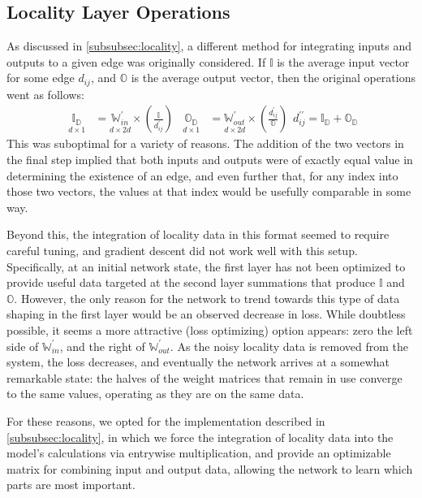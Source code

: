 \subsection{Locality Layer Operations}
\label{subsec:localops}
As discussed in \ref{subsubsec:locality}, a different method for integrating 
inputs and outputs to a given edge was originally considered. If $\mathbb{I}$ is 
the average input vector for some edge $d_{ij}$, and $\mathbb{O}$ is the average 
output vector, then the original operations went as follows:
\begin{subequations}
\begin{align}
	\underset{d \times 1}{\mathbb{I_D}} &= \underset{d \times 
	2d}{\mathbb{W}_{in}^\prime} \times 
	\left(\frac{\mathbb{I}}{d_{ij}^\prime}\right) &
	\underset{d \times 1}{\mathbb{O_D}} &= \underset{d \times 
		2d}{\mathbb{W}_{out}^\prime} \times 
		\left(\frac{d_{ij}^\prime}{\mathbb{O}}\right)
\end{align}
\begin{equation}
		d_{ij}^{\prime\prime} = \mathbb{I_D} + \mathbb{O_D}
\end{equation}
\end{subequations}
This was suboptimal for a variety of reasons. The addition of the two vectors in 
the final step implied that both inputs and outputs were of exactly equal value 
in determining the existence of an edge, and even further that, for any index 
into those two vectors, the values at that index would be usefully comparable in 
some way.

Beyond this, the integration of locality data in this format seemed to require 
careful tuning, and gradient descent did not work well with this setup.  
Specifically, at an initial network state, the first layer has not been 
optimized to provide useful data targeted at the second layer summations that 
produce $\mathbb{I}$ and $\mathbb{O}$. However, the only reason for the network 
to trend towards this type of data shaping in the first layer would be an 
observed decrease in loss. While doubtless possible, it seems a more attractive 
(loss optimizing) option appears: zero the left side of 
$\mathbb{W}_{in}^\prime$, and the right of $\mathbb{W}_{out}^\prime$. As the 
noisy locality data is removed from the system, the loss decreases, and 
eventually the network arrives at a somewhat remarkable state: the halves of the 
weight matrices that remain in use converge to the same values, operating as 
they are on the same data.

For these reasons, we opted for the implementation described in 
\ref{subsubsec:locality}, in which we force the integration of locality data 
into the model's calculations via entrywise multiplication, and provide an 
optimizable matrix for combining input and output data, allowing the network to 
learn which parts are most important.

